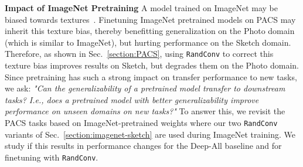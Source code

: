 \documentclass{article} \usepackage{iclr2021_conference,times}
\newcommand{\RandConv}{\texttt{RandConv}}
\begin{document}
\textbf{Impact of ImageNet Pretraining} A model trained on ImageNet may be biased towards textures~\citep{geirhos2018imagenettrained}. 
Finetuning ImageNet pretrained models on PACS may inherit this texture bias, thereby benefitting generalization on the Photo domain (which is similar to ImageNet), but hurting performance on the Sketch domain. Therefore, as shown in Sec.~\ref{section:PACS}, using {\RandConv} to correct this texture bias improves results on Sketch, but degrades them on the Photo domain. Since pretraining has such a strong impact on transfer performance to new tasks, we ask: \emph{"Can the generalizability of a pretrained model transfer to downstream tasks? I.e., does a pretrained model with better generalizability improve performance on unseen domains on new tasks?"} To answer this, we revisit the PACS tasks based on  ImageNet-pretrained weights where our two {\RandConv} variants of Sec.~\ref{section:imagenet-sketch} are used during ImageNet training. We study if this results in performance changes for the Deep-All baseline and for finetuning with {\RandConv}.
\end{document}
